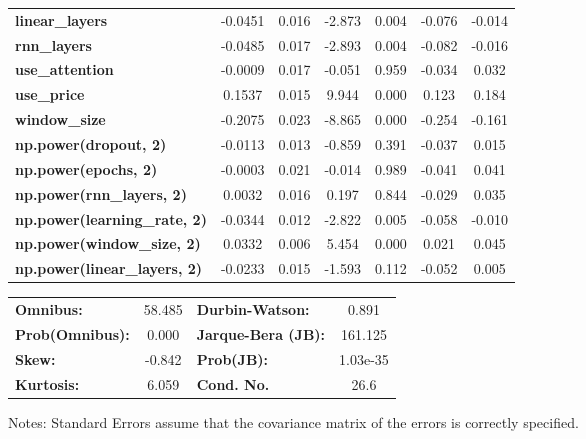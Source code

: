 \begin{center}
\begin{tabular}{lcccccc}
\textbf{linear\_layers}              &      -0.0451  &        0.016     &    -2.873  &         0.004        &       -0.076    &       -0.014     \\
\textbf{rnn\_layers}                 &      -0.0485  &        0.017     &    -2.893  &         0.004        &       -0.082    &       -0.016     \\
\textbf{use\_attention}              &      -0.0009  &        0.017     &    -0.051  &         0.959        &       -0.034    &        0.032     \\
\textbf{use\_price}                  &       0.1537  &        0.015     &     9.944  &         0.000        &        0.123    &        0.184     \\
\textbf{window\_size}                &      -0.2075  &        0.023     &    -8.865  &         0.000        &       -0.254    &       -0.161     \\
\textbf{np.power(dropout, 2)}        &      -0.0113  &        0.013     &    -0.859  &         0.391        &       -0.037    &        0.015     \\
\textbf{np.power(epochs, 2)}         &      -0.0003  &        0.021     &    -0.014  &         0.989        &       -0.041    &        0.041     \\
\textbf{np.power(rnn\_layers, 2)}    &       0.0032  &        0.016     &     0.197  &         0.844        &       -0.029    &        0.035     \\
\textbf{np.power(learning\_rate, 2)} &      -0.0344  &        0.012     &    -2.822  &         0.005        &       -0.058    &       -0.010     \\
\textbf{np.power(window\_size, 2)}   &       0.0332  &        0.006     &     5.454  &         0.000        &        0.021    &        0.045     \\
\textbf{np.power(linear\_layers, 2)} &      -0.0233  &        0.015     &    -1.593  &         0.112        &       -0.052    &        0.005     \\
\bottomrule
\end{tabular}
\begin{tabular}{lclc}
\textbf{Omnibus:}       & 58.485 & \textbf{  Durbin-Watson:     } &    0.891  \\
\textbf{Prob(Omnibus):} &  0.000 & \textbf{  Jarque-Bera (JB):  } &  161.125  \\
\textbf{Skew:}          & -0.842 & \textbf{  Prob(JB):          } & 1.03e-35  \\
\textbf{Kurtosis:}      &  6.059 & \textbf{  Cond. No.          } &     26.6  \\
\bottomrule
\end{tabular}
\end{center}

Notes: \newline
 [1] Standard Errors assume that the covariance matrix of the errors is correctly specified.